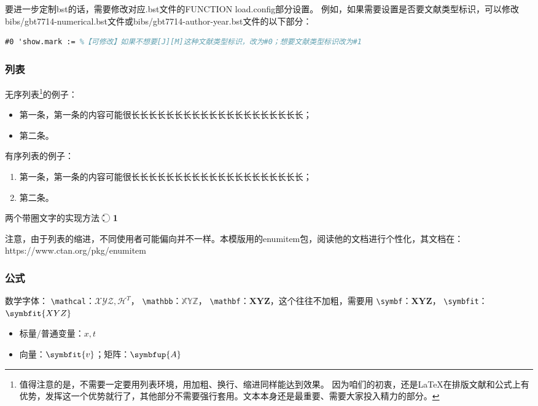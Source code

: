 \begin{refsection}
要进一步定制bst的话，需要修改对应.bst文件的FUNCTION {load.config}部分设置。
例如，如果需要设置是否要文献类型标识，可以修改bibs/gbt7714-numerical.bst文件或bibs/gbt7714-author-year.bst文件的以下部分：
\begin{lstlisting}[language=tex, basicstyle=\ttfamily\small, keywordstyle=\color{blue}, commentstyle=\color{gray}]
  #0 'show.mark := %【可修改】如果不想要[J][M]这种文献类型标识，改为#0；想要文献类型标识改为#1
\end{lstlisting}

\subsubsection{列表}
无序列表\footnote{值得注意的是，不需要一定要用列表环境，用加粗、换行、缩进同样能达到效果。
	因为咱们的初衷，还是LaTeX在排版文献和公式上有优势，发挥这一个优势就行了，其他部分不需要强行套用。文本本身还是最重要、需要大家投入精力的部分。}的例子：
\begin{itemize}[left= 50pt]
	\item[-] 第一条，第一条的内容可能很长长长长长长长长长长长长长长长长长长长长；
	\item[-] 第二条。
\end{itemize}

有序列表的例子：
\begin{enumerate}[left= 50pt]
	\item 第一条，第一条的内容可能很长长长长长长长长长长长长长长长长长长长长；
	\item 第二条。
\end{enumerate}

两个带圈文字的实现方法：
\textcircled{}
\textcircled{\textbf{\small 1}}

注意，由于列表的缩进，不同使用者可能偏向并不一样。本模版用的enumitem包，阅读他的文档进行个性化，其文档在：https://www.ctan.org/pkg/enumitem


\subsubsection{公式}

数学字体：
\verb|\mathcal|：$\mathcal{XYZ},\mathcal{H}^T$，
\verb|\mathbb|：$\mathbb{XYZ}$，
\verb|\mathbf|：$\mathbf{XYZ}$，这个往往不加粗，需要用
\verb|\symbf|：$\symbf{XYZ}$，
\verb|\symbfit|：$\symbfit{XYZ}$

\begin{itemize}
	\item 标量/普通变量：$x,t$
	\item 向量：$\symbfit{v}$；矩阵：$\symbfup{A}$
\end{itemize}


\end{refsection}

